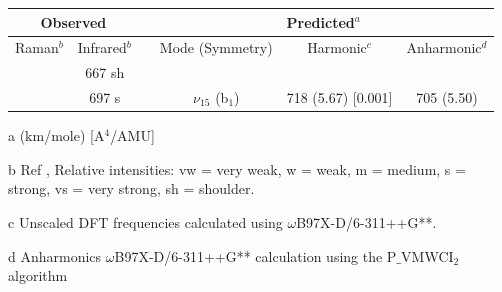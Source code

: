  
 
 \begin{table}[H]
 	\begin{center}
 		\begin{threeparttable}
 			\begin{tabular}{c c c c c c}
 				\hline
 				\multicolumn{ 2}{c}{Observed} & \multicolumn{1}{c}{} & \multicolumn{ 3}{c}{Predicted$^{a}$} \\ \hline
 				Raman$^{b}$ & \multicolumn{1}{c}{Infrared$^{b}$} &  & \multicolumn{1}{c}{Mode (Symmetry)} & \multicolumn{1}{c}{Harmonic$^{c}$} & Anharmonic$^{d}$ \\ \hline
 & 667 sh &  &  &  &  \\ 
 & 697 s &  & \multicolumn{1}{c}{$\nu_{15}$ (b$_{1}$)} & 718 (5.67) [0.001] & 705 (5.50) \\ 
 \bottomrule
	\end{tabular}
	
	\begin{tablenotes}
		\item[a] (km/mole) [A$^{4}$/AMU]
		\item[b] Ref \cite{michaelian2014raman}, Relative intensities: vw = very weak, w = weak, m = medium, s = strong, vs = very strong, sh = shoulder.
		\item[c] Unscaled DFT frequencies calculated using $\omega$B97X-D/6-311++G**.
		\item[d] Anharmonics $\omega$B97X-D/6-311++G** calculation using the P$\_$VMWCI$_{2}$ algorithm
	\end{tablenotes}
\end{threeparttable}
\end{center}
\label{lowfreq-Fluorene}
\end{table}



